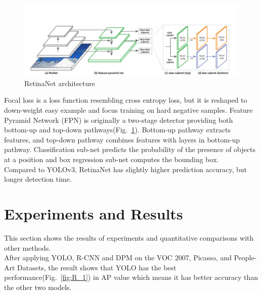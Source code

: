 \documentclass[letterpaper]{article} %
\begin{document}
\begin{figure}[ht]
\hspace{-10mm}
\centering
\includegraphics[scale = 0.36]{Figure/retinanet.png}
\caption{\footnotesize{RetinaNet architecture}}
\label{fig:retinanet}
\vspace{0mm}
\end{figure}

\noindent Focal loss is a loss function resembling cross entropy loss, but it is reshaped to down-weight easy example and focus training on hard negative samples. Feature Pyramid Network (FPN) is originally a two-stage detector providing both bottom-up and top-down pathways(Fig.~\ref{fig:retinanet}). Bottom-up pathway extracts features, and top-down pathway combines features with layers in bottom-up pathway. Classification sub-net predicts the probability of the presence of objects at a position and box regression sub-net computes the bounding box.\\

\noindent Compared to YOLOv3, RetinaNet has slightly higher prediction accuracy, but longer detection time.

\section{Experiments and Results}
This section shows the results of experiments and quantitative comparisons with other methods.\\

\noindent After applying YOLO, R-CNN and DPM on the VOC 2007, Picasso, and People-Art Datasets, the result shows that YOLO has the best performance(Fig.~\ref{fig:R_1}) in AP value which means it has better accuracy than the other two models.
\end{document}
